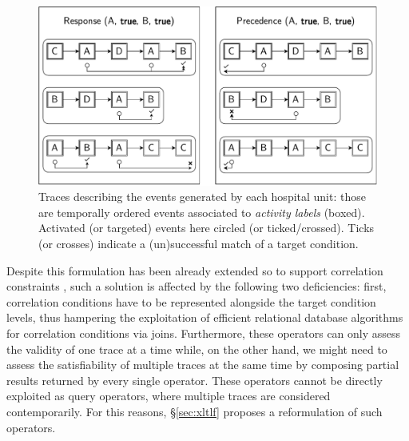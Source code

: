 \begin{figure}[!t]
	\centering

\includegraphics[width=\linewidth]{images/ActivationTargetExample.pdf}
	\caption{Traces describing the events generated by each hospital unit: those are temporally ordered events associated to \textit{activity labels} (boxed). Activated  (or targeted) events here circled (or ticked/crossed). Ticks (or crosses) indicate a (un)successful match of a target condition.}
	\label{fig:comparison}
\end{figure}
Despite this formulation has been already extended so to support correlation constraints \cite{BurattinMS16}, such a solution is affected by the following two deficiencies: first, correlation conditions have to be represented alongside the target condition levels, thus hampering the exploitation of efficient relational database algorithms for correlation conditions via joins. Furthermore, these operators can only assess the validity of one trace at a time while, on the other hand, we might need to assess the satisfiability of multiple traces at the same time by composing partial results returned by every single operator. These operators cannot be directly exploited as query operators, where multiple traces are considered contemporarily. %
For this reasons, \S\ref{sec:xltlf} proposes a reformulation of such operators. 
